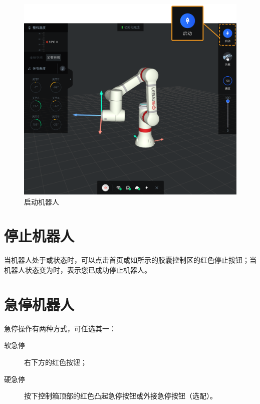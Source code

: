 \begin{figure}[ht]
	\centering
	\includegraphics[width=\textwidth]{screen/2-16.png}
	\caption{启动机器人}
	\label{fig:启动机器人}
\end{figure}

\section{停止机器人}
当机器人处于或状态时，可以点击首页或如所示的胶囊控制区的红色停止按钮；当机器人状态变为时，表示您已成功停止机器人。


\section{急停机器人}

急停操作有两种方式，可任选其一：
\begin{description}
	\item[软急停] \LM 右下方的红色按钮；
	\item[硬急停] 按下控制箱顶部的红色凸起急停按钮或外接急停按钮（选配）。
\end{description}

